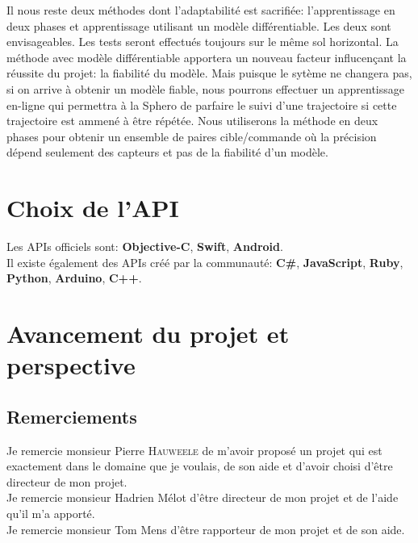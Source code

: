\documentclass[12pt,a4paper,oneside, titlepage]{article}
\begin{document}
Il nous reste deux méthodes dont l'adaptabilité est sacrifiée: l'apprentissage en deux phases et apprentissage utilisant un modèle différentiable.
Les deux sont envisageables. Les tests seront effectués toujours sur le même sol horizontal.
La méthode avec modèle différentiable apportera un nouveau facteur influcençant la réussite du projet: la fiabilité du modèle.
Mais puisque le sytème ne changera pas, si on arrive à obtenir un modèle fiable, nous pourrons effectuer un apprentissage en-ligne qui permettra à la Sphero de parfaire le suivi d'une trajectoire si cette trajectoire est ammené à être répétée.
Nous utiliserons la méthode en deux phases pour obtenir un ensemble de paires cible/commande où la précision dépend seulement des capteurs et pas de la fiabilité d'un modèle.

\section{Choix de l'API}
Les APIs officiels sont:\cite{SDKofficiels} \textbf{Objective-C}, \textbf{Swift}, \textbf{Android}.\\
Il existe également des APIs créé par la communauté:\cite{gosphero} \textbf{C\#}, \textbf{JavaScript}, \textbf{Ruby}, \textbf{Python}\cite{pythonAPI}, \textbf{Arduino}, \textbf{C++}\cite{cppAPI}.\\
\section{Avancement du projet et perspective}
\subsection*{Remerciements}
\noindent Je remercie monsieur Pierre \textsc{Hauweele} de m'avoir proposé un projet qui est exactement dans le domaine que je voulais, de son aide et d'avoir choisi d'être directeur de mon projet.\\

\noindent Je remercie monsieur Hadrien Mélot d'être directeur de mon projet et de l'aide qu'il m'a apporté.\\

\noindent Je remercie monsieur Tom Mens d'être rapporteur de mon projet et de son aide.\\


\end{document}
